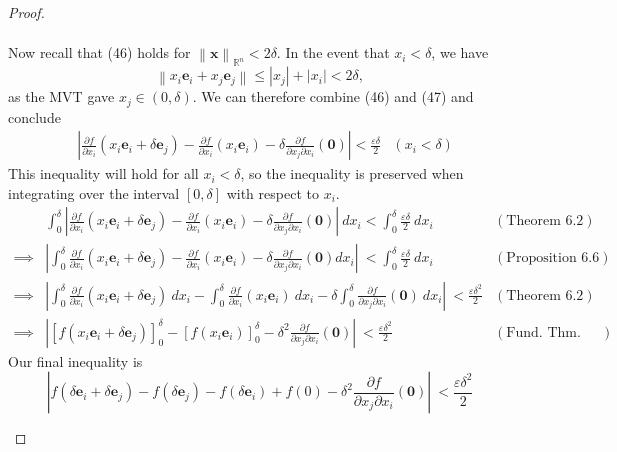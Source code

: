 \documentclass{article}
\newcommand{\R}{\mathbb{R}}
\newcommand{\x}{\mathbf{x}}
\newcommand{\ze}{\mathbf{0}}
\newcommand{\norm}[1]{\left\lVert#1\right\rVert}
\newcommand{\abs}[1]{\left\lvert#1\right\rvert}
\theoremstyle{definition}
\begin{document}
\begin{proof}
\begin{enumerate}
\begin{align}
	\end{align}
	Now recall that (46) holds for $ \norm{\x}_{\R^n}<2\delta $.  In the event that $ x_i < \delta  $, we have $$ \norm{x_i\mathbf e_i + x_j \mathbf e_j} \le |x_j| + |x_i| < 2\delta,$$ as the MVT gave $ x_j\in(0,\delta) $. We can therefore combine (46) and (47) and conclude 
	\begin{align*}
	&\abs{	\frac{\partial f}{\partial x_i}(x_i\mathbf e_i + \delta \mathbf e_j) - \frac{\partial f}{\partial x_i}(x_i\mathbf e_i)  - \delta \frac{\partial f}{\partial x_j\partial x_i}(\ze) }<\frac{ \varepsilon\delta}{2} & (x_i<\delta)
	\end{align*}
	This inequality will hold for all $ x_i < \delta $, so the inequality is preserved when integrating over the interval $ [0,\delta] $ with respect to $ x_i $.
		\begin{align*}
		&\int_{0}^{\delta}\abs{	\frac{\partial f}{\partial x_i}(x_i\mathbf e_i + \delta \mathbf e_j) - \frac{\partial f}{\partial x_i}(x_i\mathbf e_i)  - \delta \frac{\partial f}{\partial x_j\partial x_i}(\ze) }\ dx_i<\int_{0}^{\delta}\frac{ \varepsilon\delta}{2} \ dx_i& (\text{Theorem 6.2})\\
		\implies &
		\abs{\int_{0}^{\delta}	\frac{\partial f}{\partial x_i}(x_i\mathbf e_i + \delta \mathbf e_j) - \frac{\partial f}{\partial x_i}(x_i\mathbf e_i)  - \delta \frac{\partial f}{\partial x_j\partial x_i}(\ze) dx_i}\ <\int_{0}^{\delta}\frac{ \varepsilon\delta}{2} \ dx_i &(\text{Proposition 6.6})\\
			\implies &
		\abs{\int_{0}^{\delta}	\frac{\partial f}{\partial x_i}(x_i\mathbf e_i + \delta \mathbf e_j)\ dx_i - \int_{0}^{\delta}\frac{\partial f}{\partial x_i}(x_i\mathbf e_i)\ dx_i  - \delta\int_{0}^{\delta} \frac{\partial f}{\partial x_j\partial x_i}(\ze)\ dx_i}\ <\frac{ \varepsilon\delta^2}{2}  &(\text{Theorem 6.2})\\
			\implies &
		\abs{[f(x_i\mathbf e_i + \delta \mathbf e_j)]_0^\delta- [f(x_i\mathbf e_i)]_0^\delta  - \delta^2\frac{\partial f}{\partial x_j\partial x_i}(\ze)}\ <\frac{ \varepsilon\delta^2}{2}  &(\text{Fund. Thm. Calc})
	\end{align*}
	Our final inequality is 
	\begin{equation}\label{key}
			\abs{f(\delta\mathbf e_i + \delta \mathbf e_j) - f(\delta \mathbf e_j) -f(\delta\mathbf e_i ) + f(0) - \delta^2\frac{\partial f}{\partial x_j\partial x_i}(\ze)}\ <\dfrac{\varepsilon\delta^2}{2}
	\end{equation}
	

\end{enumerate}
\end{proof}
\end{document}
